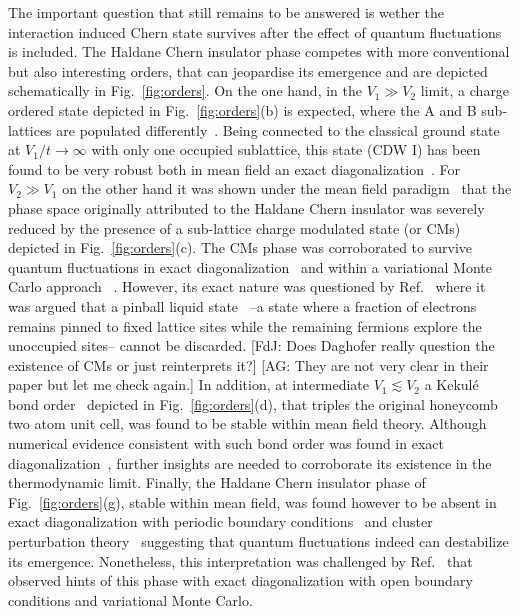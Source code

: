 \documentclass[aps,prx,10pt,twocolumn,floatfix,superscriptaddress,showpacs,numerical,footinbib]{revtex4-1}
\newcommand{\noteAG}[1]{{\color{blue} [AG: #1]}}
\newcommand{\noteFdJ}[1]{{\color{cyan} [FdJ: #1]}}
\begin{document}
The important question that still remains to be answered is wether the interaction induced Chern state survives 
after the effect of quantum fluctuations is included.
%
The Haldane Chern insulator phase competes with more conventional but also interesting orders, 
that can jeopardise its emergence and are depicted schematically in Fig.~\ref{fig:orders}.
%
On the one hand, in the $V_{1} \gg V_{2}$ limit, a charge ordered state depicted in Fig.~\ref{fig:orders}(b) is expected, 
where the A and B sub-lattices are populated differently~\cite{RQHZ08,WCT14}.
%
Being connected to the classical ground state at $V_{1}/t \to \infty$ with only one occupied sublattice, this state (CDW I) has been found to be very robust both in mean field an exact diagonalization~\cite{GGNVC13,DH14}.
%
For $V_{2}\gg V_{1}$ on the other hand it was shown under the mean field paradigm~\cite{GCC13} that the phase space originally attributed to the Haldane Chern insulator 
was severely reduced by the presence of a sub-lattice charge modulated state (or CMs) depicted in Fig.~\ref{fig:orders}(c).
%
The CMs phase was corroborated to survive quantum fluctuations in exact diagonalization~\cite{GGNVC13,DCH14} and within a variational Monte Carlo approach~\cite{DCH14} .
%
However, its exact nature was questioned by Ref.~\cite{DH14} where it was argued that a pinball liquid state~\cite{HF06,MRF13} --a state where a fraction of electrons remains pinned to fixed lattice sites while the remaining fermions explore the unoccupied sites-- cannot be discarded. \noteFdJ{Does Daghofer really question the existence of CMs or just reinterprets it?}\noteAG{They are not very clear in their paper but let me check again.}
%
In addition, at intermediate $V_{1}\lesssim V_{2}$ a Kekul\'e bond order~\cite{C00,HCM07,WF10,RH10,RJH13} depicted in Fig.~\ref{fig:orders}(d), that triples the original honeycomb two atom unit cell, 
was found to be stable within mean field theory.
%
Although numerical evidence consistent with such bond order was found in exact diagonalization~\cite{GGNVC13}, further insights are needed to corroborate its existence in the thermodynamic limit.
%
Finally, the Haldane Chern insulator phase of Fig.~\ref{fig:orders}(g), stable within mean field, was found however to be absent in exact diagonalization with periodic boundary conditions~\cite{GGNVC13,DH14} and cluster perturbation theory~\cite{DH14} suggesting that quantum fluctuations indeed can destabilize its emergence.
%
Nonetheless, this interpretation was challenged by Ref.~\cite{DCH14} that observed hints of this phase with exact diagonalization with open boundary conditions and variational Monte Carlo.\\
\end{document}
